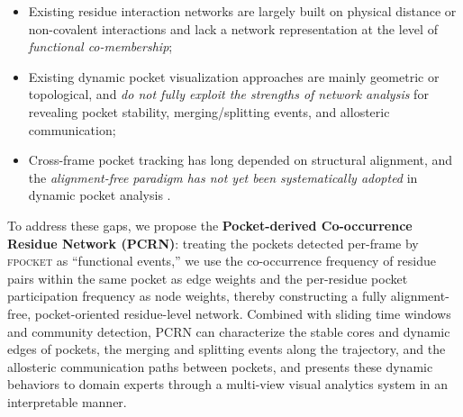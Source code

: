 \documentclass[11pt,a4paper]{article}
\begin{document}
\begin{itemize}
  \item Existing residue interaction networks are largely built on
        physical distance or non-covalent interactions and lack a
        network representation at the level of \emph{functional
        co-membership};
  \item Existing dynamic pocket visualization approaches are mainly
        geometric or topological, and \emph{do not fully exploit the
        strengths of network analysis} for revealing pocket
        stability, merging/splitting events, and allosteric
        communication;
  \item Cross-frame pocket tracking has long depended on structural
        alignment, and the \emph{alignment-free paradigm has not yet
        been systematically adopted} in dynamic pocket analysis
        \citep{eguida2022estimating,weill2010alignment}.
\end{itemize}

To address these gaps, we propose the \textbf{Pocket-derived
Co-occurrence Residue Network (PCRN)}: treating the pockets detected
per-frame by \textsc{fpocket} as ``functional events,'' we use the
co-occurrence frequency of residue pairs within the same pocket as
edge weights and the per-residue pocket participation frequency as
node weights, thereby constructing a fully alignment-free,
pocket-oriented residue-level network. Combined with sliding time
windows and community detection, PCRN can characterize the stable
cores and dynamic edges of pockets, the merging and splitting events
along the trajectory, and the allosteric communication paths between
pockets, and presents these dynamic behaviors to domain experts
through a multi-view visual analytics system in an interpretable
manner.


\end{document}
